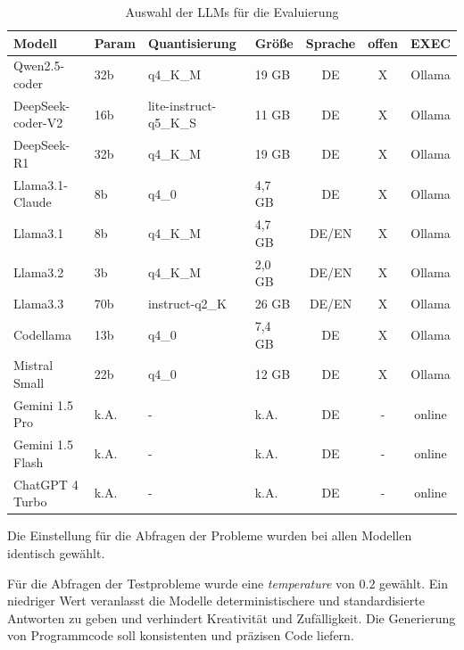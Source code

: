 \begin{table}[!ht]
	\begin{tabular}{|l|l|l|l|c|c|c|}
		\hline
		\textbf{Modell} & \textbf{Param} & \textbf{Quantisierung} & \textbf{Größe} & \textbf{Sprache} & \textbf{offen} & \textbf{EXEC} \\
		\hline
		Qwen2.5-coder     &  32b &               q4\_K\_M &  19 GB &    DE & X & Ollama \\
		DeepSeek-coder-V2 &  16b & lite-instruct-q5\_K\_S &  11 GB &    DE & X & Ollama \\
		DeepSeek-R1       &  32b &               q4\_K\_M &  19 GB &    DE & X & Ollama \\
		Llama3.1-Claude   &   8b &                  q4\_0 & 4,7 GB &    DE & X & Ollama \\
		Llama3.1          &   8b &               q4\_K\_M & 4,7 GB & DE/EN & X & Ollama \\
		Llama3.2          &   3b &               q4\_K\_M & 2,0 GB & DE/EN & X & Ollama \\
		Llama3.3          &  70b &         instruct-q2\_K &  26 GB & DE/EN & X & Ollama \\
		Codellama         &  13b &                  q4\_0 & 7,4 GB &    DE & X & Ollama \\
		Mistral Small     &  22b &                  q4\_0 &  12 GB &    DE & X & Ollama \\
		Gemini 1.5 Pro    & k.A. &                      - &   k.A. &    DE & - & online \\
		Gemini 1.5 Flash  & k.A. &                      - &   k.A. &    DE & - & online \\
		ChatGPT 4 Turbo   & k.A. &                      - &   k.A. &    DE & - & online \\
		\hline
		\hline
	\end{tabular}
	\caption{Auswahl der LLMs für die Evaluierung}
	\label{tab:selected_llms}
\end{table}

Die Einstellung für die Abfragen der Probleme wurden bei allen Modellen identisch gewählt.\vspace{0.2cm}

Für die Abfragen der Testprobleme wurde eine \textit{temperature} von $0.2$ gewählt. Ein niedriger Wert veranlasst die Modelle deterministischere und standardisierte Antworten zu geben und verhindert Kreativität und Zufälligkeit. Die Generierung von Programmcode soll konsistenten und präzisen Code liefern.\vspace{0.2cm}

